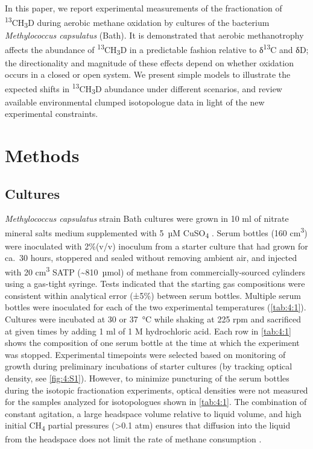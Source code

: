 In this paper, we report experimental measurements of the fractionation
of \textsuperscript{13}CH\textsubscript{3}D during aerobic me\-thane
oxidation by cultures of the bacterium \emph{Methylococcus capsulatus}
(Bath). It is demonstrated that aerobic methanotrophy affects the
abundance of \textsuperscript{13}CH\textsubscript{3}D in a predictable
fashion relative to δ\textsuperscript{13}C and δD; the directionality
and magnitude of these effects depend on whether oxidation occurs in a
closed or open system. We present simple models to illustrate the
expected shifts in \textsuperscript{13}CH\textsubscript{3}D abundance
under different scenarios, and review available environmental clumped
isotopologue data in light of the new experimental constraints.

\section{Methods}\label{sec:4:methods}

\subsection{Cultures}\label{sec:4:cultures}



\emph{Methylococcus capsulatus} strain Bath cultures were grown in 10 ml
of nitrate mineral salts medium supplemented with 5~µM
CuSO\textsubscript{4} \parencite{Welander+Summons_2012_PNAS}. Serum bottles (160
cm\textsuperscript{3}) were inoculated with 2\%(v/v) inoculum from a
starter culture that had grown for ca.\ 30 hours, stoppered and sealed
without removing ambient air, and injected with 20 cm\textsuperscript{3}
SATP (\textasciitilde{}810~µmol) of methane from commercially-sourced
cylinders using a gas-tight syringe. Tests indicated that the starting
gas compositions were consistent within analytical error (±5\%) between
serum bottles. Multiple serum bottles were inoculated for each of the
two experimental temperatures (\autoref{tab:4:1}). Cultures were incubated at 30
or 37~°C while shaking at 225 rpm and sacrificed at given times by
adding 1 ml of 1 M hydrochloric acid. Each row in \autoref{tab:4:1} shows the
composition of one serum bottle at the time at which the experiment was
stopped. Experimental timepoints were selected based on monitoring of
growth during preliminary incubations of starter cultures (by tracking
optical density, see \autoref{fig:4:S1}). However, to minimize
puncturing of the serum bottles during the isotopic fractionation
experiments, optical densities were not measured for the samples
analyzed for isotopologues shown in \autoref{tab:4:1}. The combination of constant
agitation, a large headspace volume relative to liquid volume, and high
initial CH\textsubscript{4} partial pressures (\textgreater{}0.1 atm)
ensures that diffusion into the liquid from the headspace does not limit
the rate of methane consumption \parencite{Templeton++_2006_GCA,Nihous_2008_GCA}.

